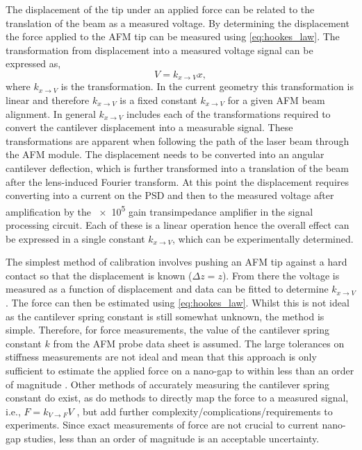 \documentclass{article}
\begin{document}
The displacement of the tip under an applied force can be related to the translation of the beam as a measured voltage. By determining the displacement the force applied to the AFM tip can be measured using \eqref{eq:hookes_law}. The transformation from displacement into a measured voltage signal can be expressed as,
\begin{equation}
V = k_{x \rightarrow V}x,
\end{equation}
where $k_{x \rightarrow V}$ is the transformation. In the current geometry this transformation is linear and therefore $k_{x \rightarrow V}$ is a fixed constant $k_{x \rightarrow V}$ for a given AFM beam alignment. In general $k_{x \rightarrow V}$ includes each of the transformations required to convert the cantilever displacement into a measurable signal. These transformations are apparent when following the path of the laser beam through the AFM module. The displacement needs to be converted into an angular cantilever deflection, which is further transformed into a translation of the beam after the lens-induced Fourier transform. At this point the displacement requires converting into a current on the PSD and then to the measured voltage after amplification by the \num{e5} gain transimpedance amplifier in the signal processing circuit. Each of these is a linear operation hence the overall effect can be expressed in a single constant $k_{x \rightarrow V}$, which can be experimentally determined.

The simplest method of calibration involves pushing an AFM tip against a hard contact so that the displacement is known ($\Delta z = z$). From there the voltage is measured as a function of displacement and data can be fitted to determine $k_{x \rightarrow V}$. The force can then be estimated using \eqref{eq:hookes_law}. Whilst this is not ideal as the cantilever spring constant is still somewhat unknown, the method is simple. Therefore, for force measurements, the value of the cantilever spring constant $k$ from the AFM probe data sheet is assumed. The large tolerances on stiffness measurements are not ideal and mean that this approach is only sufficient to estimate the applied force on a nano-gap to within {\color{red}less than an order of magnitude}%
. Other methods of accurately measuring the cantilever spring constant do exist, as do methods to directly map the force to a measured signal, i.e., $F = k_{V \rightarrow F}V$ \cite{hutter1993calibration, senden1994experimental, torii1996method, sader1999calibration, levy2002measuring, cumpson2004quantitative, gates2007precise, langlois2007spring, ohler2007cantilever}, but add further {\color{red}complexity/complications/requirements} to experiments. Since exact measurements of force are not crucial to current nano-gap studies, less than an order of magnitude is an acceptable uncertainty.

\FloatBarrier
\end{document}

